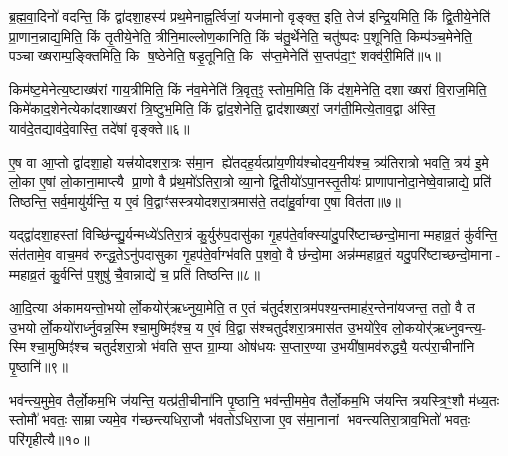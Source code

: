 {\anuvakamend[{व्याह॒ स दृ॑शी॒कवोऽर्चि॒तारः॒ स एक॑ञ्च॥१॥}]}

ब्र॒ह्म॒वा॒दिनो॑ वदन्ति॒ किं द्वा॑दशा॒हस्य॑ प्रथ॒मेनाह्न॒र्त्विजां॒ यज॑मानो वृङ्क्त॒ इति॒ तेज॑ इन्द्रि॒यमिति॒ किं द्वि॒तीये॒नेति॑ प्रा॒णान॒न्नाद्य॒मिति॒ किं तृ॒तीये॒नेति॒ त्रीनि॒माल्लोण॒कानिति॒ किं च॑तु॒र्थेनेति॒ चतु॑ष्पदः प॒शूनिति॒ किम्प॑ञ्च॒मेनेति॒ पञ्चाख्षराम्प॒ङ्क्तिमिति॒ कि ष॒ष्ठेनेति॒ षडृ॒तूनिति॒ कि स॑प्त॒मेनेति॑ स॒प्तप॑दा॒ꣳ॒ शक्व॑री॒मिति॑॥५॥

किम॑ष्ट॒मेनेत्य॒ष्टाख्ष॑रां गाय॒त्रीमिति॒ किं न॑व॒मेनेति॑ त्रि॒वृत॒ꣵ॒ स्तोम॒मिति॒ किं द॑श॒मेनेति॒ दशाख्षरां वि॒राज॒मिति॒ किमे॑काद॒शेनेत्येका॑दशाख्षरां त्रि॒ष्टुभ॒मिति॒ किं द्वा॑द॒शेनेति॒ द्वाद॑शाख्षरां॒ जग॑ती॒मित्ये॒ताव॒द्वा अ॑स्ति॒ याव॑दे॒तद्याव॑दे॒वास्ति॒ तदे॑षां वृङ्क्ते॥६॥

{\anuvakamend[{शक्व॑री॒मित्येक॑चत्वारिशच्च॥२॥}]}

ए॒ष वा आ॒प्तो द्वा॑दशा॒हो यत्त्र॑योदशरा॒त्रः स॑मा॒न ह्ये॑तदह॒र्यत्प्रा॑य॒णीय॑श्चोदय॒नीय॑श्च॒ त्र्य॑तिरात्रो भवति॒ त्रय॑ इ॒मे लो॒का ए॒षां लो॒काना॒माप्त्यै प्रा॒णो वै प्र॑थ॒मो॑ऽतिरा॒त्रो व्या॒नो द्वि॒तीयो॑ऽपा॒नस्तृ॒तीयः॑ प्राणापानोदा॒नेष्वे॒वान्नाद्ये॒ प्रति॑ तिष्ठन्ति॒ सर्व॒मायु॑र्यन्ति॒ य ए॒वं वि॒द्वाꣳ॑सस्त्रयोदशरा॒त्रमास॑ते॒ तदा॑हु॒र्वाग्वा ए॒षा वित॑ता॥७॥

यद्द्वा॑दशा॒हस्तां विच्छि॑न्द्यु॒र्यन्मध्ये॑ऽतिरा॒त्रं कु॒र्युरु॑प॒दासु॑का गृ॒हप॑ते॒र्वाक्स्या॑दु॒परि॑ष्टाच्छन्दो॒मानाम्महाव्र॒तं कु॑र्वन्ति॒ संत॑तामे॒व वाच॒मव॑ रुन्द्ध॒तेऽनु॑पदासुका गृ॒हप॑ते॒र्वाग्भ॑वति प॒शवो॒ वै छ॑न्दो॒मा अन्न॑म्महाव्र॒तं यदु॒परि॑ष्टाच्छन्दो॒माना- म्महाव्र॒तं कु॒र्वन्ति॑ प॒शुषु॑ चै॒वान्नाद्ये॑ च॒ प्रति॑ तिष्ठन्ति॥८॥

{\anuvakamend[{वित॑ता॒ त्रिच॑त्वारिशच्च॥३॥}]}

आ॒दि॒त्या अ॑कामयन्तो॒भयोर्लो॒कयोर्॑ऋध्नुया॒मेति॒ त ए॒तं च॑तुर्दशरा॒त्रम॑पश्य॒न्तमाह॑र॒न्तेना॑यजन्त॒ ततो॒ वै त उ॒भयोर्लो॒कयो॑रार्ध्नुवन्न॒स्मिश्चा॒मुष्मिꣵ॑श्च॒ य ए॒वं वि॒द्वास॑श्चतुर्दशरा॒त्रमास॑त उ॒भयो॑रे॒व लो॒कयोर्\mbox{}॑ऋध्नुवन्त्य॒- स्मिश्चा॒मुष्मिꣵ॑श्च चतुर्दशरा॒त्रो भ॑वति स॒प्त ग्रा॒म्या ओष॑धयः स॒प्तार॒ण्या उ॒भयी॑षा॒मव॑रुद्ध्यै॒ यत्प॑रा॒चीना॑नि पृ॒ष्ठानि॑॥९॥

भव॑न्त्य॒मुमे॒व तैर्लो॒कम॒भि ज॑यन्ति॒ यत्प्र॑ती॒चीना॑नि पृ॒ष्ठानि॒ भव॑न्ती॒ममे॒व तैर्लो॒कम॒भि ज॑यन्ति त्रयस्त्रि॒ꣳ॒शौ म॑ध्य॒तः स्तोमौ॑ भवतः॒ साम्राज्यमे॒व ग॑च्छन्त्यधिरा॒जौ भ॑वतोऽधिरा॒जा ए॒व स॑मा॒नानां भवन्त्यतिरा॒त्राव॒भितो॑ भवतः॒ परि॑गृहीत्यै॥१०॥

{\anuvakamend[{पृ॒ष्ठानि॒ चतु॑स्त्रिशच्च॥४॥}]}

